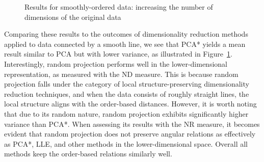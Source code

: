 \documentclass[pdftex,12pt,a4paper]{report}
\begin{document}
\begin{figure}[!htb]
    \caption{Results for smoothly-ordered data: increasing the number of dimensions of the original data}\label{fig:avg_dev_vs_high_dim-oneline}
\end{figure}

Comparing these results to the outcomes of dimensionality reduction methods applied to data connected by a smooth line, we see that PCA* yields a mean result similar to PCA but with lower variance, as illustrated in Figure~\ref{fig:avg_dev_vs_high_dim-oneline}.
Interestingly, random projection performs well in the lower-dimensional representation, as measured with the ND measure.
This is because random projection falls under the category of local structure-preserving dimensionality reduction techniques, and when the data consists of roughly straight lines, the local structure aligns with the order-based distances.
However, it is worth noting that due to its random nature, random projection exhibits significantly higher variance than PCA*.
When assessing its results with the NR measure, it becomes evident that random projection does not preserve angular relations as effectively as PCA*, LLE, and other methods in the lower-dimensional space.
Overall all methods keep the order-based relations similarly well.
\end{document}
